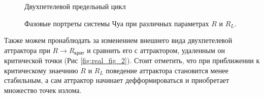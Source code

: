 \documentclass[12pt]{article}
\begin{document}
\begin{figure}[H]
\begin{minipage}[h]{0.47\linewidth}
	\end{minipage}
	\vfill
	\begin{minipage}[h]{0.47\linewidth}
	 Двухпетелевой предельный цикл
	\end{minipage}
	\caption{Фазовые портреты системы Чуа при различных параметрах $R$ и $R_L$.}
	\label{fig:real_fig_1}
\end{figure}

Также можем пронаблюдать за изменением внешнего вида двухпетелевой аттрактора при $R \rightarrow R_{\text{крит}}$ и сравнить его с аттрактором, удаленным он критической точки (Рис \ref{fig:real_fig_2}). 
Стоит отметить, что при приближении к критическому знаечнию $R$ и $R_L$ поведение аттрактора становится менее стабильным, а сам аттрактор начинает дефформироваться и приобретает множество точек излома.
\end{document}
